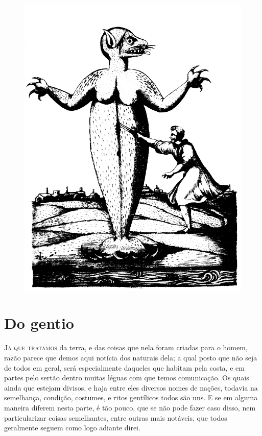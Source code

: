 \begin{figure}
\centering
\includegraphics[width=\textwidth]{1.png}
\end{figure}

\chapter[Do gentio]{Do gentio} 

\noindent\textsc{Já que tratamos} da terra, e das coisas que nela foram criadas para o
homem, razão parece que demos aqui notícia dos naturais dela; a qual
posto que não seja de todos em geral, será especialmente daqueles que
habitam pela costa, e em partes pelo sertão dentro muitas léguas com
que temos comunicação. Os quais ainda que estejam divisos, e haja entre
eles diversos nomes de nações, todavia na semelhança, condição,
costumes, e ritos gentílicos todos são uns. E se em alguma maneira diferem
nesta parte, é tão pouco, que se não pode fazer caso disso, nem
particularizar coisas semelhantes, entre outras mais notáveis, que
todos geralmente seguem como logo adiante direi.

